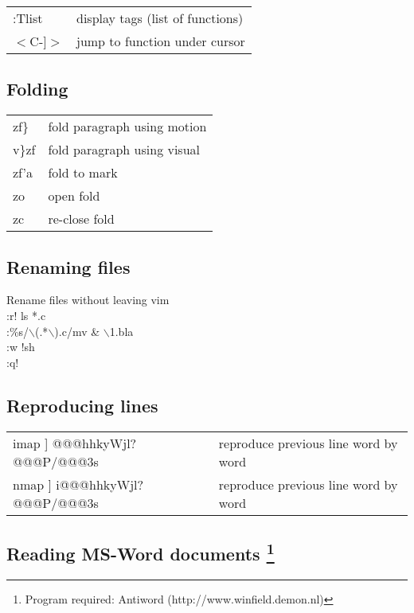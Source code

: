 \begin{center}
\begin{longtable}{l|l}
:Tlist & display tags (list of functions)\\
$<$C-]$>$  & jump to function under cursor
\end{longtable}
\end{center}

\subsection{Folding}
\begin{center}
\begin{longtable}{l|l}
 zf\} & fold paragraph using motion\\
 v\}zf & fold paragraph using visual\\
 zf'a & fold to mark\\
 zo & open fold\\
 zc & re-close fold
\end{longtable}
\end{center}

\subsection{Renaming files}
 Rename files without leaving vim\\
 :r! ls *.c\\
 :\%s/$\backslash$(.*$\backslash$).c/mv \& $\backslash$1.bla\\
 :w !sh\\
 :q!

\subsection{Reproducing lines}
\begin{center}
\begin{longtable}{l|l}
 imap ] @@@hhkyWjl?@@@P/@@@3s & reproduce previous line word by word\\
 nmap ] i@@@hhkyWjl?@@@P/@@@3s & reproduce previous line word by word
\end{longtable}
\end{center}

\subsection[Reading MS-Word documents]
{Reading MS-Word documents \footnote{Program required: Antiword (http://www.winfield.demon.nl)}}

